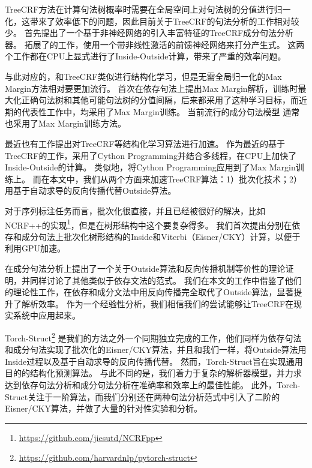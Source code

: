 TreeCRF方法在计算句法树概率时需要在全局空间上对句法树的分值进行归一化，这带来了效率低下的问题，因此目前关于TreeCRF的句法分析的工作相对较少。
\citet{finkel-etal-2008-efficient}首先提出了一个基于非神经网络的引入丰富特征的TreeCRF成分句法分析器。
\citet{durrett-klein-2015-neural}拓展了\citet{finkel-etal-2008-efficient}的工作，使用一个带非线性激活的前馈神经网络来打分产生式。
这两个工作都在CPU上显式进行了Inside-Outside计算，带来了严重的效率问题。

与此对应的，和TreeCRF类似进行结构化学习，但是无需全局归一化的Max Margin方法相对要更加流行。
\citet{taskar-etal-2004-max}首次在依存句法上提出Max Margin解析，训练时最大化正确句法树和其他可能句法树的分值间隔，后来\citet{mcdonald-etal-2005-online,mcdonald-etal-2005-online}都采用了这种学习目标，而近期的代表性工作中，\citet{wang-chang-2016-graph,kiperwasser-goldberg-2016-simple}均采用了Max Margin训练。
当前流行的成分句法模型 \citep{stern-etal-2017-minimal,kitaev-klein-2018-constituency,zhou-zhao-2019-head}通常也采用了Max Margin训练方法。

最近也有工作提出对TreeCRF等结构化学习算法进行加速。
\citet{zhang-etal-2017-dependency-parsing,jiang-etal-2018-supervised,li-etal-2019-semi-supervised}作为最近的基于TreeCRF的工作，采用了Cython Programming并结合多线程，在CPU上加快了Inside-Outside的计算。
类似地，\citet{kitaev-klein-2018-constituency}将Cython Programming应用到了Max Margin训练上。
而在本文中，我们从两个方面来加速TreeCRF算法：1）批次化技术；2）用基于自动求导的反向传播代替Outside算法。

对于序列标注任务而言，批次化很直接，并且已经被很好的解决，比如NCRF++的实现\footnote{\url{https://github.com/jiesutd/NCRFpp}}，但是在树形结构中这个要复杂得多。
我们首次提出分别在依存和成分句法上批次化树形结构的Inside和Viterbi（Eisner/CKY）计算，以便于利用GPU加速。

\citet{eisner-2016-inside}在成分句法分析上提出了一个关于Outside算法和反向传播机制等价性的理论证明，并同样讨论了其他类似于依存文法的范式。
我们在本文的工作中借鉴了他们的理论性工作，在依存和成分文法中用反向传播完全取代了Outside算法，显著提升了解析效率。
作为一个经验性分析，我们相信我们的尝试能够让TreeCRF在现实系统中应用起来。

Torch-Struct\footnote{\url{https://github.com/harvardnlp/pytorch-struct}} \citep{rush-2020-torch}是我们的方法之外一个同期独立完成的工作，他们同样为依存句法和成分句法实现了批次化的Eisner/CKY算法，并且和我们一样，将Outside算法用Inside过程以及基于自动求导的反向传播代替。
然而，Torch-Struct旨在实现通用目的的结构化预测算法。
与此不同的是，我们着力于复杂的解析器模型，并力求达到依存句法分析和成分句法分析在准确率和效率上的最佳性能。
此外，Torch-Struct关注于一阶算法，而我们分别还在两种句法分析范式中引入了二阶的Eisner/CKY算法，并做了大量的针对性实验和分析。


